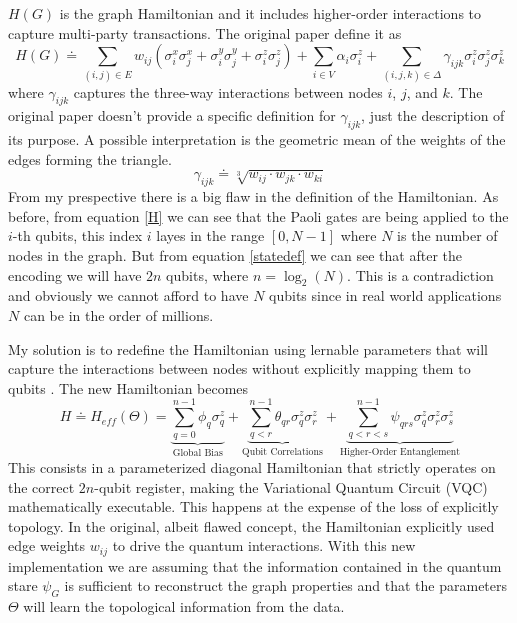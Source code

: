 \(H(G)\) is the graph Hamiltonian and it includes higher-order interactions to capture multi-party transactions. The original paper define it as
\begin{equation}\label{H}
    H(G) \doteq \sum_{(i,j)\in E}w_{ij}(\sigma_{i}^{x}\sigma_{j}^{x}+\sigma_{i}^{y}\sigma_{j}^{y}+\sigma_{i}^{z}\sigma_{j}^{z})+\sum_{i\in V}\alpha_{i}\sigma_{i}^{z}+\sum_{(i,j,k)\in\Delta}\gamma_{ijk}\sigma_{i}^{z}\sigma_{j}^{z}\sigma_{k}^{z}
\end{equation}
where $\gamma_{ijk}$ captures the three-way interactions between nodes \(i\), \(j\), and \(k\). The original paper doesn't provide a specific definition for \(\gamma_{ijk}\), just the description of its purpose. A possible interpretation is the geometric mean of the weights of the edges forming the triangle.
\begin{equation}
    \gamma_{ijk} \doteq \sqrt[3]{w_{ij} \cdot w_{jk} \cdot w_{ki}}
\end{equation}
From my prespective there is a big flaw in the definition of the Hamiltonian. As before, from equation \ref{H} we can see that the Paoli gates are being applied to the \(i\)-th qubits, this index \(i\) layes in the range \([0, N-1]\) where \(N\) is the number of nodes in the graph. But from equation \ref{statedef} we can see that after the encoding we will have \(2n\) qubits, where \(n = \log_2(N)\). This is a contradiction and obviously we cannot afford to have \(N\) qubits since in real world applications \(N\) can be in the order of millions.

My solution is to redefine the Hamiltonian using lernable parameters that will capture the interactions between nodes without explicitly mapping them to qubits \cite{newHam}. The new Hamiltonian becomes
\begin{equation}
    H \doteq H_{eff}(\Theta) = \underbrace{\sum_{q=0}^{n-1} \phi_q \sigma_q^z}_{\text{Global Bias}} + \underbrace{\sum_{q < r}^{n-1} \theta_{qr} \sigma_q^z \sigma_r^z}_{\text{Qubit Correlations}} + \underbrace{\sum_{q < r < s}^{n-1} \psi_{qrs} \sigma_q^z \sigma_r^z \sigma_s^z}_{\text{Higher-Order Entanglement}}
\end{equation}
This consists in a parameterized diagonal Hamiltonian that strictly operates on the correct $2n$-qubit register, making the Variational Quantum Circuit (VQC) mathematically executable. This happens at the expense of the loss of explicitly topology. In the original, albeit flawed concept, the Hamiltonian explicitly used edge weights $w_{ij}$ to drive the quantum interactions. With this new implementation we are assuming that the information contained in the quantum stare \(\psi_G\) is sufficient to reconstruct the graph properties and that the parameters \(\Theta\) will learn the topological information from the data.


